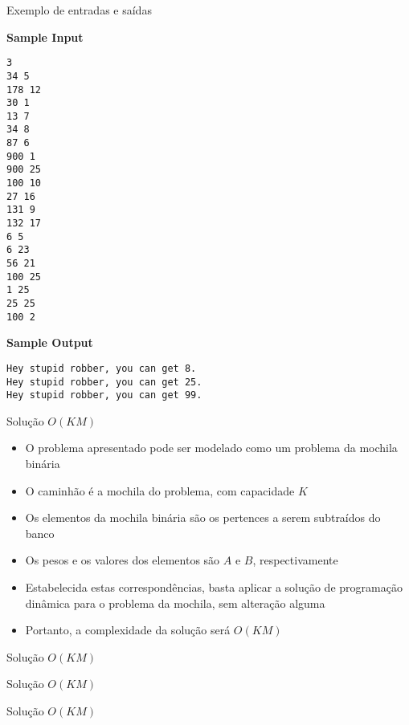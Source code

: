 \begin{frame}[fragile]{Exemplo de entradas e saídas}

\begin{scriptsize}
\begin{minipage}[t]{0.45\textwidth}
\textbf{Sample Input}
\begin{verbatim}
3
34 5
178 12
30 1
13 7
34 8
87 6
900 1
900 25
100 10
27 16
131 9
132 17
6 5
6 23
56 21
100 25
1 25
25 25
100 2
\end{verbatim}
\end{minipage}
\begin{minipage}[t]{0.5\textwidth}
\textbf{Sample Output}
\begin{verbatim}
Hey stupid robber, you can get 8.
Hey stupid robber, you can get 25.
Hey stupid robber, you can get 99.
\end{verbatim}
\end{minipage}
\end{scriptsize}

\end{frame}

\begin{frame}[fragile]{Solução $O(KM)$}

    \begin{itemize}
        \item O problema apresentado pode ser modelado como um problema da mochila binária

        \item O caminhão é a mochila do problema, com capacidade $K$

        \item Os elementos da mochila binária são os pertences a serem subtraídos do banco

        \item Os pesos e os valores dos elementos são $A$ e $B$, respectivamente

        \item Estabelecida estas correspondências, basta aplicar a solução de programação
            dinâmica para o problema da mochila, sem alteração alguma

        \item Portanto, a complexidade da solução será $O(KM)$
    \end{itemize}

\end{frame}

\begin{frame}[fragile]{Solução $O(KM)$}
\end{frame}

\begin{frame}[fragile]{Solução $O(KM)$}
\end{frame}

\begin{frame}[fragile]{Solução $O(KM)$}
\end{frame}
